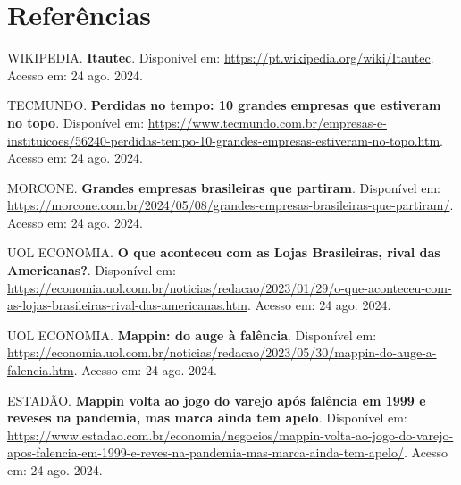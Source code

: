 \newpage
{} %

\section{Referências}

\vspace{0.5cm} %

\noindent WIKIPEDIA. \textbf{Itautec}. Disponível em: \url{https://pt.wikipedia.org/wiki/Itautec}. Acesso em: 24 ago. 2024.


\noindent TECMUNDO. \textbf{Perdidas no tempo: 10 grandes empresas que estiveram no topo}. Disponível em: \url{https://www.tecmundo.com.br/empresas-e-instituicoes/56240-perdidas-tempo-10-grandes-empresas-estiveram-no-topo.htm}. Acesso em: 24 ago. 2024.


\noindent MORCONE. \textbf{Grandes empresas brasileiras que partiram}. Disponível em: \url{https://morcone.com.br/2024/05/08/grandes-empresas-brasileiras-que-partiram/}. Acesso em: 24 ago. 2024.


\noindent UOL ECONOMIA. \textbf{O que aconteceu com as Lojas Brasileiras, rival das Americanas?}. Disponível em: \url{https://economia.uol.com.br/noticias/redacao/2023/01/29/o-que-aconteceu-com-as-lojas-brasileiras-rival-das-americanas.htm}. Acesso em: 24 ago. 2024.


\noindent UOL ECONOMIA. \textbf{Mappin: do auge à falência}. Disponível em: \url{https://economia.uol.com.br/noticias/redacao/2023/05/30/mappin-do-auge-a-falencia.htm}. Acesso em: 24 ago. 2024.


\noindent ESTADÃO. \textbf{Mappin volta ao jogo do varejo após falência em 1999 e reveses na pandemia, mas marca ainda tem apelo}. Disponível em: \url{https://www.estadao.com.br/economia/negocios/mappin-volta-ao-jogo-do-varejo-apos-falencia-em-1999-e-reves-na-pandemia-mas-marca-ainda-tem-apelo/}. Acesso em: 24 ago. 2024.